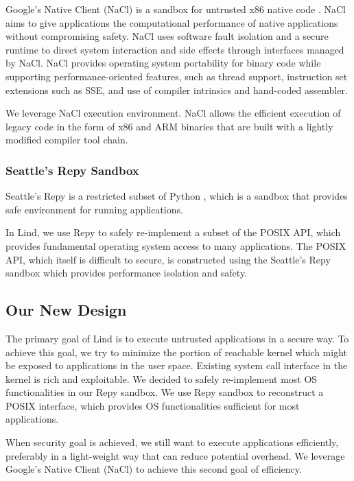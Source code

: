 Google's Native Client (NaCl) is a sandbox for untrusted x86 native code \cite{NaCl:09}. 
NaCl aims to give applications the computational performance of native applications 
without compromising safety. NaCl uses software fault isolation 
and a secure runtime to direct system interaction and side effects through interfaces managed by NaCl. NaCl provides operating system portability for binary code while supporting performance-oriented features, 
such as thread support, instruction set extensions such as SSE, and use of compiler intrinsics and 
hand-coded assembler. 

We leverage NaCl execution environment. NaCl allows the efficient execution of legacy code 
in the form of x86 and ARM binaries that are built with a lightly modified compiler tool chain.

\subsubsection{Seattle's Repy Sandbox}

Seattle's Repy is a restricted subset of Python \cite{Repy:10}, which is a sandbox that 
provides safe environment for running applications.

In Lind, we use Repy to safely re-implement a subset of the POSIX API, which provides 
fundamental operating system access to many applications. The POSIX API, which itself is difficult to secure, 
is constructed using the Seattle's Repy sandbox which provides performance isolation and safety. 


\subsection{Our New Design}

The primary goal of Lind is to execute untrusted applications in a secure way. To achieve this goal, 
we try to minimize the portion of reachable kernel which might be exposed to applications in the user space. 
Existing system call interface in the kernel is rich and exploitable. We decided to safely re-implement most OS
functionalities in our Repy sandbox. We use Repy sandbox to reconstruct a POSIX interface, which provides 
OS functionalities sufficient for most applications. 
   
When security goal is achieved, we still want to execute applications efficiently, preferably in a light-weight 
way that can reduce potential overhead. We leverage Google's Native Client (NaCl) to achieve
this second goal of efficiency.  

